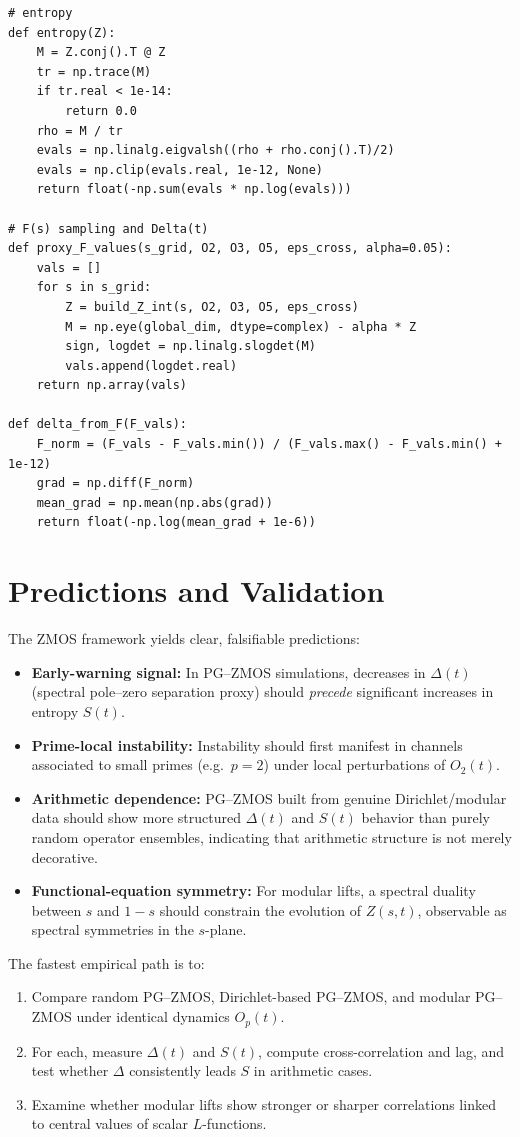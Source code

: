 \documentclass[11pt]{article}
\begin{document}
\begin{verbatim}
# entropy
def entropy(Z):
    M = Z.conj().T @ Z
    tr = np.trace(M)
    if tr.real < 1e-14:
        return 0.0
    rho = M / tr
    evals = np.linalg.eigvalsh((rho + rho.conj().T)/2)
    evals = np.clip(evals.real, 1e-12, None)
    return float(-np.sum(evals * np.log(evals)))

# F(s) sampling and Delta(t)
def proxy_F_values(s_grid, O2, O3, O5, eps_cross, alpha=0.05):
    vals = []
    for s in s_grid:
        Z = build_Z_int(s, O2, O3, O5, eps_cross)
        M = np.eye(global_dim, dtype=complex) - alpha * Z
        sign, logdet = np.linalg.slogdet(M)
        vals.append(logdet.real)
    return np.array(vals)

def delta_from_F(F_vals):
    F_norm = (F_vals - F_vals.min()) / (F_vals.max() - F_vals.min() + 1e-12)
    grad = np.diff(F_norm)
    mean_grad = np.mean(np.abs(grad))
    return float(-np.log(mean_grad + 1e-6))
\end{verbatim}

\section{Predictions and Validation}

The ZMOS framework yields clear, falsifiable predictions:

\begin{itemize}
  \item \textbf{Early-warning signal:} In PG--ZMOS simulations,
  decreases in $\Delta(t)$ (spectral pole--zero separation proxy) should
  \emph{precede} significant increases in entropy $S(t)$.
  \item \textbf{Prime-local instability:} Instability should first
  manifest in channels associated to small primes (e.g.\ $p=2$) under
  local perturbations of $O_2(t)$.
  \item \textbf{Arithmetic dependence:} PG--ZMOS built from genuine
  Dirichlet/modular data should show more structured $\Delta(t)$ and
  $S(t)$ behavior than purely random operator ensembles, indicating that
  arithmetic structure is not merely decorative.
  \item \textbf{Functional-equation symmetry:} For modular lifts, a
  spectral duality between $s$ and $1-s$ should constrain the evolution
  of $Z(s,t)$, observable as spectral symmetries in the $s$-plane.
\end{itemize}

The fastest empirical path is to:
\begin{enumerate}
  \item Compare random PG--ZMOS, Dirichlet-based PG--ZMOS, and modular
  PG--ZMOS under identical dynamics $O_p(t)$.
  \item For each, measure $\Delta(t)$ and $S(t)$, compute cross-correlation
  and lag, and test whether $\Delta$ consistently leads $S$ in arithmetic
  cases.
  \item Examine whether modular lifts show stronger or sharper correlations
  linked to central values of scalar $L$-functions.
\end{enumerate}
\end{document}
